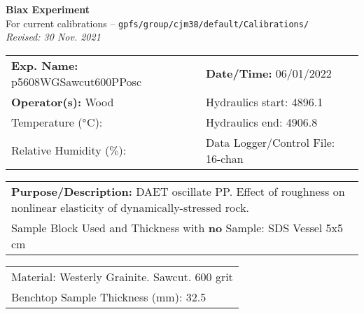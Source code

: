 \documentclass[letterpaper, 10pt]{article}
\begin{document}
\begin{center}
    {\Large \textbf{Biax Experiment}}\\
    {\small For current calibrations -- \texttt{gpfs/group/cjm38/default/Calibrations/}}\\
    {\footnotesize \textit{Revised: 30 Nov. 2021}}
\end{center}



\begin{table}[!ht]
	\renewcommand{\arraystretch}{1.1}
	\begin{tabular}{p{10cm} p{10cm} }
	    \textbf{Exp. Name: }p5608WGSawcut600PPosc & \textbf{Date/Time: }06/01/2022\\
	    \textbf{Operator(s): }Wood & Hydraulics start: 4896.1 \\
	    Temperature ($\degree$C):  & Hydraulics end: 4906.8 \\
	    Relative Humidity ($\%$):  & Data Logger/Control File: 16-chan \\
	\end{tabular}
\end{table} 
\vspace{-0.5cm} 

\begin{table}[!ht]
	\renewcommand{\arraystretch}{1.1}
	\begin{tabular}{p{20cm}}\textbf{Purpose/Description:} DAET oscillate PP. Effect of roughness on nonlinear elasticity of dynamically-stressed rock.  \\Sample Block Used and Thickness with \textbf{no} Sample: SDS Vessel 5x5 cm \\
	\end{tabular}
    \end{table} \vspace{-0.5cm} 

\begin{table}[!ht]
        \small
        \renewcommand{\arraystretch}{1.2}
        \begin{tabular}{ |p{7cm}| } \hline 
Material: Westerly Grainite. Sawcut. 600 grit \\Benchtop Sample Thickness (mm): 32.5 \\ \hline \end{tabular} \end{table} \vspace{-0.5cm} 
\end{document}
